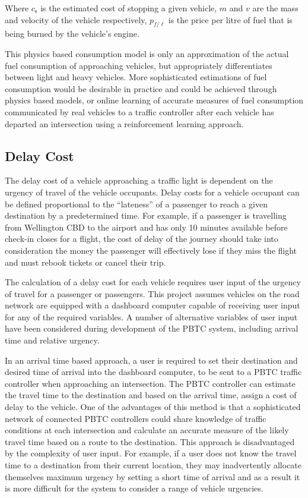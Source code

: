 Where $c_\text{s}$ is the estimated cost of stopping a given vehicle, $m$ and $v$ are the mass and velocity of the vehicle respectively, $p_{f\text{/}\ell}$ is the price per litre of fuel that is being burned by the vehicle's engine.

This physics based consumption model is only an approximation of the actual fuel consumption of approaching vehicles, but appropriately differentiates between light and heavy vehicles. More sophisticated estimations of fuel consumption would be desirable in practice and could be achieved through physics based models, or online learning of accurate measures of fuel consumption communicated by real vehicles to a traffic controller after each vehicle has departed an intersection using a reinforcement learning approach.

\subsection{Delay Cost}
\label{sec:design_delay_cost}

The delay cost of a vehicle approaching a traffic light is dependent on the urgency of travel of the vehicle occupants. Delay costs for a vehicle occupant can be defined proportional to the ``lateness'' of a passenger to reach a given destination by a predetermined time. For example, if a passenger is travelling from Wellington CBD to the airport and has only 10 minutes available before check-in closes for a flight, the cost of delay of the journey should take into consideration the money the passenger will effectively lose if they miss the flight and must rebook tickets or cancel their trip.

The calculation of a delay cost for each vehicle requires user input of the urgency of travel for a passenger or passengers. This project assumes vehicles on the road network are equipped with a dashboard computer capable of receiving user input for any of the required variables. A number of alternative variables of user input have been considered during development of the PBTC system, including arrival time and relative urgency. 

In an arrival time based approach, a user is required to set their destination and desired time of arrival into the dashboard computer, to be sent to a PBTC traffic controller when approaching an intersection. The PBTC controller can estimate the travel time to the destination and based on the arrival time, assign a cost of delay to the vehicle. One of the advantages of this method is that a sophisticated network of connected PBTC controllers could share knowledge of traffic conditions at each intersection and calculate an accurate measure of the likely travel time based on a route to the destination. This approach is disadvantaged by the complexity of user input. For example, if a user does not know the travel time to a destination from their current location, they may inadvertently allocate themselves maximum urgency by setting a short time of arrival and as a result it is more difficult for the system to consider a range of vehicle urgencies.


